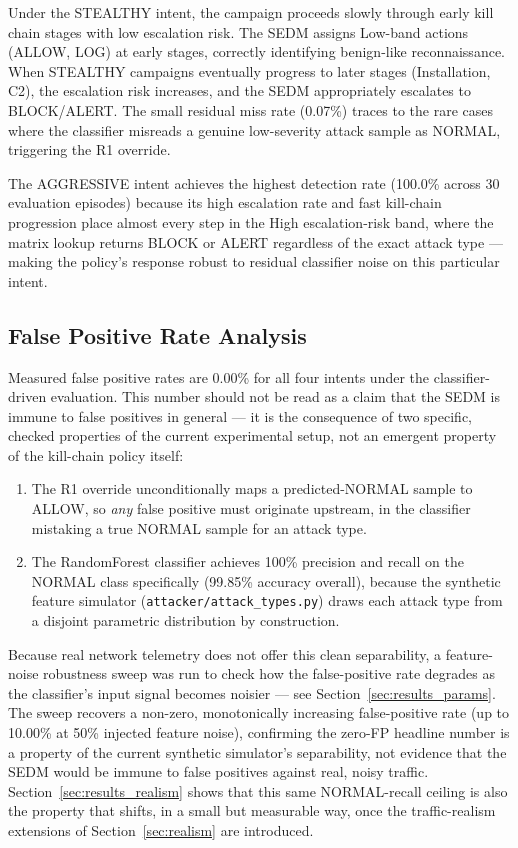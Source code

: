 Under the STEALTHY intent, the campaign proceeds slowly through early kill
chain stages with low escalation risk.
The SEDM assigns Low-band actions (ALLOW, LOG) at early stages, correctly
identifying benign-like reconnaissance.
When STEALTHY campaigns eventually progress to later stages (Installation,
C2), the escalation risk increases, and the SEDM appropriately escalates
to BLOCK/ALERT.
The small residual miss rate (0.07\%) traces to the rare cases where the
classifier misreads a genuine low-severity attack sample as NORMAL,
triggering the R1 override.

The AGGRESSIVE intent achieves the highest detection rate (100.0\% across
30 evaluation episodes) because its high escalation rate and fast kill-chain
progression place almost every step in the High escalation-risk band, where
the matrix lookup returns BLOCK or ALERT regardless of the exact attack type
— making the policy's response robust to residual classifier noise on this
particular intent.

\subsection{False Positive Rate Analysis}

Measured false positive rates are 0.00\% for all four intents under the
classifier-driven evaluation. This number should not be read as a claim
that the SEDM is immune to false positives in general — it is the
consequence of two specific, checked properties of the current experimental
setup, not an emergent property of the kill-chain policy itself:

\begin{enumerate}
  \item The R1 override unconditionally maps a predicted-NORMAL sample to
        ALLOW, so \emph{any} false positive must originate upstream, in the
        classifier mistaking a true NORMAL sample for an attack type.
  \item The RandomForest classifier achieves 100\% precision and recall on
        the NORMAL class specifically (99.85\% accuracy overall), because
        the synthetic feature simulator (\texttt{attacker/attack\_types.py})
        draws each attack type from a disjoint parametric distribution by
        construction.
\end{enumerate}

Because real network telemetry does not offer this clean separability, a
feature-noise robustness sweep was run to check how the false-positive rate
degrades as the classifier's input signal becomes noisier — see
Section~\ref{sec:results_params}. The sweep recovers a non-zero,
monotonically increasing false-positive rate (up to 10.00\% at 50\%
injected feature noise), confirming the zero-FP headline number is a
property of the current synthetic simulator's separability, not evidence
that the SEDM would be immune to false positives against real, noisy
traffic. Section~\ref{sec:results_realism} shows that this same
NORMAL-recall ceiling is also the property that shifts, in a small but
measurable way, once the traffic-realism extensions of
Section~\ref{sec:realism} are introduced.


